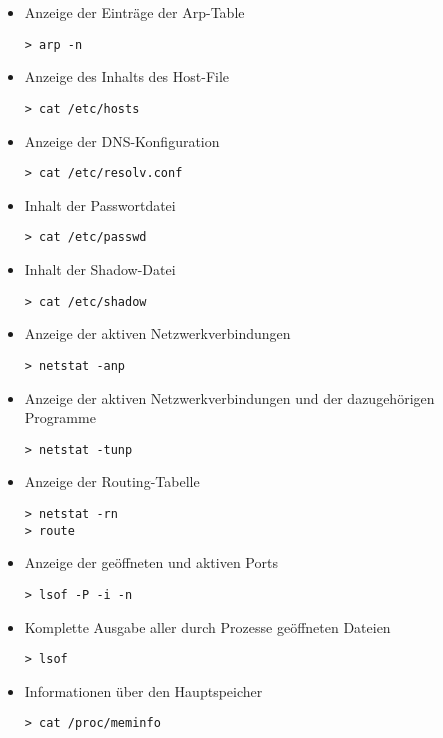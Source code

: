 \begin{itemize}
\item  Anzeige der Einträge der Arp-Table
\begin{lstlisting}
> arp -n
\end{lstlisting}

\item  Anzeige des Inhalts des Host-File
\begin{lstlisting}
> cat /etc/hosts
\end{lstlisting}

\item  Anzeige der DNS-Konfiguration
\begin{lstlisting}
> cat /etc/resolv.conf
\end{lstlisting}

\item  Inhalt der Passwortdatei
\begin{lstlisting}
> cat /etc/passwd
\end{lstlisting}

\item  Inhalt der Shadow-Datei
\begin{lstlisting}
> cat /etc/shadow
\end{lstlisting}

\item  Anzeige der aktiven Netzwerkverbindungen
\begin{lstlisting}
> netstat -anp
\end{lstlisting}

\item Anzeige der aktiven Netzwerkverbindungen und der dazugehörigen Programme
\begin{lstlisting}
> netstat -tunp
\end{lstlisting}

\item  Anzeige der Routing-Tabelle
\begin{lstlisting}
> netstat -rn
> route
\end{lstlisting}

\item Anzeige der geöffneten und aktiven Ports 
\begin{lstlisting}
> lsof -P -i -n
\end{lstlisting}

\item  Komplette Ausgabe aller durch Prozesse geöffneten Dateien
\begin{lstlisting}
> lsof
\end{lstlisting}

\item  Informationen über den Hauptspeicher
\begin{lstlisting}
> cat /proc/meminfo
\end{lstlisting}


\end{itemize}

